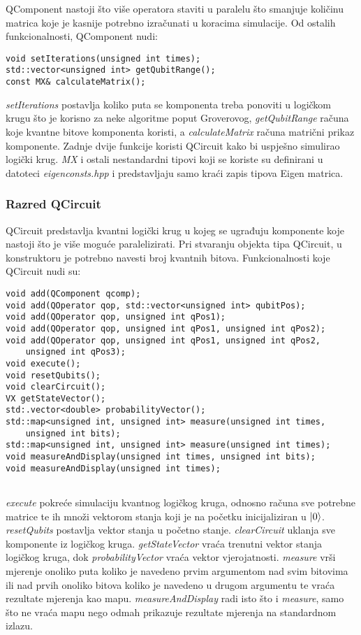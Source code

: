 QComponent nastoji što više operatora staviti u paralelu što smanjuje količinu matrica koje je kasnije potrebno izračunati u koracima simulacije. Od ostalih funkcionalnosti, QComponent nudi:
\begin{lstlisting}
void setIterations(unsigned int times);
std::vector<unsigned int> getQubitRange();
const MX& calculateMatrix();
\end{lstlisting}
\emph{setIterations} postavlja koliko puta se komponenta treba ponoviti u logičkom krugu što je korisno za neke algoritme poput Groverovog, \emph{getQubitRange} računa koje kvantne bitove komponenta koristi, a \emph{calculateMatrix} računa matrični prikaz komponente. Zadnje dvije funkcije koristi QCircuit kako bi uspješno simulirao logički krug. \emph{MX} i ostali nestandardni tipovi koji se koriste su definirani u datoteci \emph{eigenconsts.hpp} i predstavljaju samo kraći zapis tipova Eigen matrica.

\subsubsection{Razred QCircuit}

QCircuit predstavlja kvantni logički krug u kojeg se ugrađuju komponente koje nastoji što je više moguće paralelizirati. Pri stvaranju objekta tipa QCircuit, u konstruktoru je potrebno navesti broj kvantnih bitova. Funkcionalnosti koje QCircuit nudi su:
\begin{lstlisting}
void add(QComponent qcomp);
void add(QOperator qop, std::vector<unsigned int> qubitPos);
void add(QOperator qop, unsigned int qPos1);
void add(QOperator qop, unsigned int qPos1, unsigned int qPos2);
void add(QOperator qop, unsigned int qPos1, unsigned int qPos2,
	unsigned int qPos3);
void execute();
void resetQubits();
void clearCircuit();
VX getStateVector();
std:.vector<double> probabilityVector();
std::map<unsigned int, unsigned int> measure(unsigned int times,
	unsigned int bits);
std::map<unsigned int, unsigned int> measure(unsigned int times);
void measureAndDisplay(unsigned int times, unsigned int bits);
void measureAndDisplay(unsigned int times);


\end{lstlisting}
\emph{execute} pokreće simulaciju kvantnog logičkog kruga, odnosno računa sve potrebne matrice te ih množi vektorom stanja koji je na početku inicijaliziran u $\ket{0}$. \emph{resetQubits} postavlja vektor stanja u početno stanje. \emph{clearCircuit} uklanja sve komponente iz logičkog kruga. \emph{getStateVector} vraća trenutni vektor stanja logičkog kruga, dok \emph{probabilityVector} vraća vektor vjerojatnosti. \emph{measure} vrši mjerenje onoliko puta koliko je navedeno prvim argumentom nad svim bitovima ili nad prvih onoliko bitova koliko je navedeno u drugom argumentu te vraća rezultate mjerenja kao mapu. \emph{measureAndDisplay} radi isto što i \emph{measure}, samo što ne vraća mapu nego odmah prikazuje rezultate mjerenja na standardnom izlazu.


